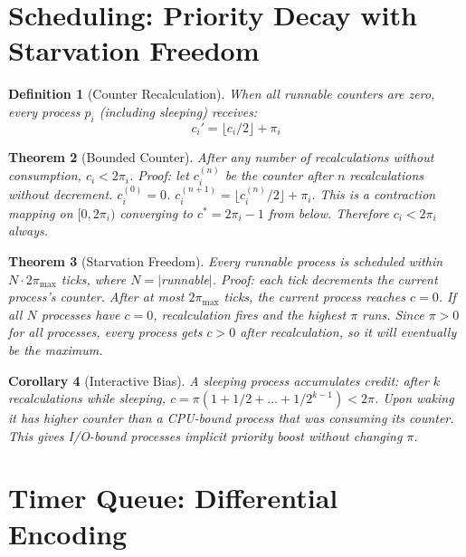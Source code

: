 \documentclass[11pt]{article}
\newtheorem{theorem}{Theorem}[section]
\newtheorem{definition}[theorem]{Definition}
\newtheorem{corollary}[theorem]{Corollary}
\begin{document}
\section{Scheduling: Priority Decay with Starvation Freedom}

\begin{definition}[Counter Recalculation]
When all runnable counters are zero, every process $p_i$ (including sleeping)
receives:
\[
  c_i' = \lfloor c_i / 2 \rfloor + \pi_i
\]
\end{definition}

\begin{theorem}[Bounded Counter]
After any number of recalculations without consumption,
$c_i < 2\pi_i$. Proof: let $c_i^{(n)}$ be the counter after $n$
recalculations without decrement.
$c_i^{(0)} = 0$.
$c_i^{(n+1)} = \lfloor c_i^{(n)}/2 \rfloor + \pi_i$.
This is a contraction mapping on $[0, 2\pi_i)$ converging to
$c^* = 2\pi_i - 1$ from below. Therefore $c_i < 2\pi_i$ always.
\end{theorem}

\begin{theorem}[Starvation Freedom]
Every runnable process is scheduled within $N \cdot 2\pi_{\max}$ ticks,
where $N = |$runnable$|$. Proof: each tick decrements the current process's
counter. After at most $2\pi_{\max}$ ticks, the current process reaches
$c = 0$. If all $N$ processes have $c = 0$, recalculation fires and the
highest $\pi$ runs. Since $\pi > 0$ for all processes, every process gets
$c > 0$ after recalculation, so it will eventually be the maximum.
\end{theorem}

\begin{corollary}[Interactive Bias]
A sleeping process accumulates credit:
after $k$ recalculations while sleeping,
$c = \pi(1 + 1/2 + \ldots + 1/2^{k-1}) < 2\pi$.
Upon waking it has higher counter than a CPU-bound process
that was consuming its counter. This gives I/O-bound processes
implicit priority boost without changing $\pi$.
\end{corollary}


\section{Timer Queue: Differential Encoding}
\end{document}
